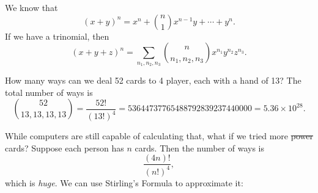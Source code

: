 \documentclass[a4paper]{article}
\begin{document}
\begin{eg}
  We know that
  \[
    (x + y)^n = x^n + \binom{n}{1}x^{n - 1}y + \cdots + y^n.
  \]
  If we have a trinomial, then
  \[
    (x + y + z)^n = \sum_{n_1, n_2, n_3} \binom{n}{n_1, n_2, n_3} x^{n_1}y^{n_2}z^{n_3}.
  \]
\end{eg}

\begin{eg}
  How many ways can we deal 52 cards to 4 player, each with a hand of 13? The total number of ways is
  \[
    \binom{52}{13, 13, 13, 13} = \frac{52!}{(13!)^4} = 53644737765488792839237440000 = 5.36\times 10^{28}.
  \]
\end{eg}


While computers are still capable of calculating that, what if we tried more \st{power} cards? Suppose each person has $n$ cards. Then the number of ways is
\[
  \frac{(4n)!}{(n!)^4},
\]
which is \emph{huge}. We can use Stirling's Formula to approximate it:
\end{document}
